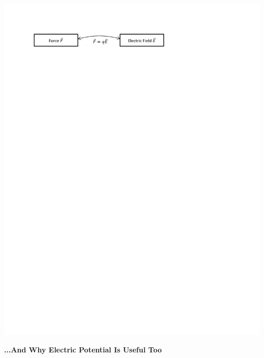 \begin{center}
\vspace{-0.1 in}
\includegraphics{potential_intro/concept_map_figs/concept_map_F_and_E.pdf}
\vspace{-0.1 in}
\end{center}


\textbf{...And Why Electric Potential Is Useful Too}

